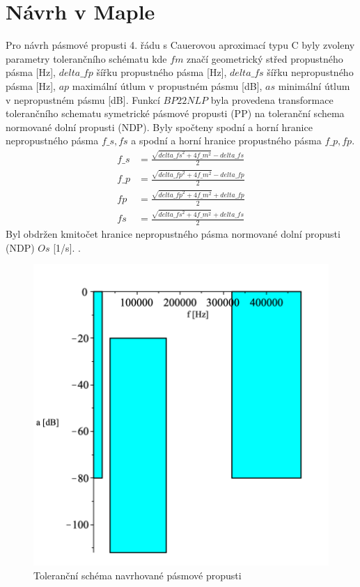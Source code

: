 \documentclass[twoside]{article}
\begin{document}
\section{Návrh v Maple}
Pro návrh pásmové propusti 4. řádu s Cauerovou aproximací typu C byly zvoleny parametry tolerančního schématu 
\noindent kde $fm$ značí geometrický střed propustného pásma [Hz], $delta\_{fp}$ šířku propustného pásma [Hz],
$delta\_{fs} $ šířku nepropustného pásma [Hz], $ap$ maximální útlum v propustném pásmu [dB], $as$ minimální útlum v nepropustném pásmu [dB].
Funkcí $BP22NLP$ byla provedena transformace tolerančního schematu symetrické pásmové propusti (PP) na toleranční schema normované dolní propusti (NDP). Byly spočteny spodní a horní hranice nepropustného pásma $f\_s,fs$ a spodní a horní hranice propustného pásma $f\_p,fp$. 
\begin{align}
f\_s &= \frac{\sqrt{delta\_{fs}^2+4f\_m ^2}-delta\_{fs}}{2}\\
f\_p &= \frac{\sqrt{delta\_{fp}^2+4f\_m ^2}-delta\_{fp}}{2}\\
fp &= \frac{\sqrt{delta\_{fp}^2+4f\_m ^2}+delta\_{fp}}{2}\\
fs &= \frac{\sqrt{delta\_{fs}^2+4f\_m ^2}+delta\_{fs}}{2}
\end{align}
\noindent Byl obdržen kmitočet hranice nepropustného pásma normované dolní propusti (NDP) $Os$ [1/s].
.
\begin{figure}[H]
\centering
\includegraphics[scale=0.6]{tolsch.png}
\caption{Toleranční schéma navrhované pásmové propusti}
\end{figure}
\end{document}

